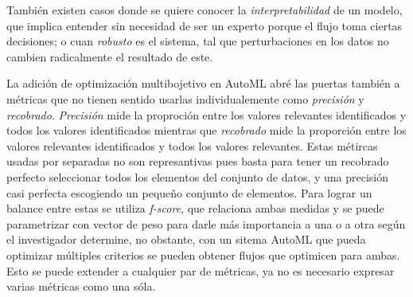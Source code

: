 Tambi\'en existen casos donde se quiere conocer la \textit{interpretabilidad} de un modelo, que implica entender sin necesidad de ser un experto porque el flujo toma ciertas decisiones; o cuan \textit{robusto} es el sistema, tal que perturbaciones en los datos no cambien radicalmente el resultado de este.

La adici\'on de optimizaci\'on multibojetivo en AutoML abr\'e las puertas tambi\'en a m\'etricas que no tienen sentido usarlas individualemente como \textit{precisi\'on} y \textit{recobrado}.
\textit{Precisi\'on} mide la proproci\'on entre los valores relevantes identificados y todos los valores identificados
mientras que \textit{recobrado} mide la proporci\'on entre los valores relevantes identificados y todos los valores relevantes.
Estas m\'etircas usadas por separadas no son represantivas pues basta para tener un recobrado perfecto seleccionar todos los elementos del conjunto de datos, y una precisi\'on casi perfecta escogiendo un pequeño conjunto de elementos.
Para lograr un balance entre estas se utiliza \textit{f-score}, que relaciona ambas medidas y se puede parametrizar con vector de peso para darle m\'as importancia a una o a otra seg\'un el investigador determine, no obstante, con un sitema AutoML que pueda optimizar m\'ultiples criterios se pueden obtener flujos que optimicen para ambas. Esto se puede extender a cualquier par de m\'etricas, ya no es necesario expresar varias m\'etricas como una s\'ola.



